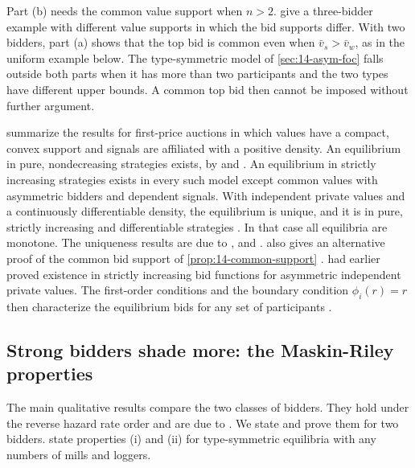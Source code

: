Part (b) needs the common value support when $n>2$. \citet[footnote 15]{AtheyHaile2007} give a
three-bidder example with different value supports in which the bid supports differ. With two
bidders, part (a) shows that the top bid is common even when $\bar v_s>\bar v_w$, as in the uniform
example below. The type-symmetric model of \cref{sec:14-asym-foc} falls outside both parts when it
has more than two participants and the two types have different upper bounds. A common top bid then
cannot be imposed without further argument.

\citet[Theorem~2.1]{AtheyHaile2007} summarize the results for first-price auctions in which values
have a compact, convex support and signals are affiliated with a positive density. An equilibrium in
pure, nondecreasing strategies exists, by \citet{Athey2001} and \citet{RenyZamir2004}
\citep[footnote~10]{AtheyHaile2007}. An equilibrium in strictly increasing strategies exists in every
such model except common values with asymmetric bidders and dependent signals. With independent
private values and a continuously differentiable density, the equilibrium is unique, and it is in
pure, strictly increasing and differentiable strategies \citep[Theorem~2.1(ii)]{AtheyHaile2007}. In
that case all equilibria are monotone. The uniqueness results are due to \citet{Lebrun1999},
\citet{Bajari2001} and \citet{MaskinRiley2003} \citep[footnote~11]{AtheyHaile2007}. \citet{Lebrun1999}
also gives an alternative proof of the common bid support of \cref{prop:14-common-support}
\citep[footnote~14]{AtheyHaile2007}. \citet{Lebrun1996} had earlier proved existence in strictly
increasing bid functions for asymmetric independent private values.
The first-order conditions and the boundary condition $\phi_i(r)=r$ then characterize the equilibrium
bids for any set of participants \citep[Section II.B]{AtheyLevinSeira2011}.

\subsection{Strong bidders shade more: the Maskin-Riley properties}\label{sec:14-asym-mr}

The main qualitative results compare the two classes of bidders. They hold under the reverse hazard
rate order and are due to \citet{MaskinRiley2000}. We state and prove them for two bidders.
\citet[Section II.B]{AtheyLevinSeira2011} state properties (i) and (ii) for type-symmetric
equilibria with any numbers of mills and loggers.

